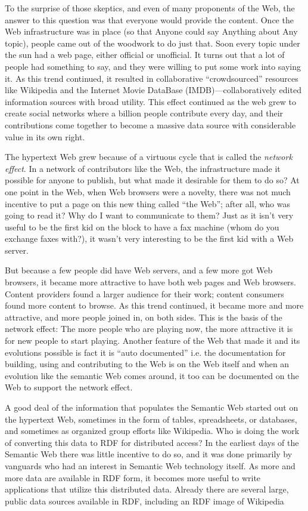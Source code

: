 To the surprise of those skeptics, and even of many proponents of the
Web, the answer to this question was that everyone would provide the
content. Once the Web infrastructure was in place (so that Anyone could
say Anything about Any topic), people came out of the woodwork to do
just that. Soon every topic under the sun had a web page, either
official or unofficial. It turns out that a lot of people had something
to say, and they were willing to put some work into saying it. As this
trend continued, it resulted in collaborative ``crowdsourced'' resources
like Wikipedia and the Internet Movie DataBase (IMDB)---collaboratively
edited information sources with broad utility. This effect continued as
the web grew to create social networks where a billion people contribute
every day, and their contributions come together to become a massive
data source with considerable value in its own right.

The hypertext Web grew because of a virtuous cycle that is called the
\emph{network effect}. In a network of contributors like the Web, the
infrastructure made it possible for anyone to publish, but what made it
desirable for them to do so? At one point in the Web, when Web browsers
were a novelty, there was not much incentive to put a page on this new
thing called ``the Web''; after all, who was going to read it? Why do I
want to communicate to them? Just as it isn't very useful to be the
first kid on the block to have a fax machine (whom do you exchange faxes
with?), it wasn't very interesting to be the first kid with a Web
server.

But because a few people did have Web servers, and a few more got Web
browsers, it became more attractive to have both web pages and Web
browsers. Content providers found a larger audience for their work;
content consumers found more content to browse. As this trend continued,
it became more and more attractive, and more people joined in, on both
sides. This is the basis of the network effect: The more people who are
playing now, the more attractive it is for new people to start playing.
Another feature of the Web that made it and its evolutions possible is
fact it is ``auto documented'' i.e. the documentation for building,
using and contributing to the Web is on the Web itself and when an
evolution like the semantic Web comes around, it too can be documented
on the Web to support the network effect.

A good deal of the information that populates the Semantic Web started
out on the hypertext Web, sometimes in the form of tables, spreadsheets,
or databases, and sometimes as organized group efforts like Wikipedia.
Who is doing the work of converting this data to RDF for distributed
access? In the earliest days of the Semantic Web there was little
incentive to do so, and it was done primarily by vanguards who had an
interest in Semantic Web technology itself. As more and more data are
available in RDF form, it becomes more useful to write applications that
utilize this distributed data. Already there are several large, public
data sources available in RDF, including an RDF image of Wikipedia

